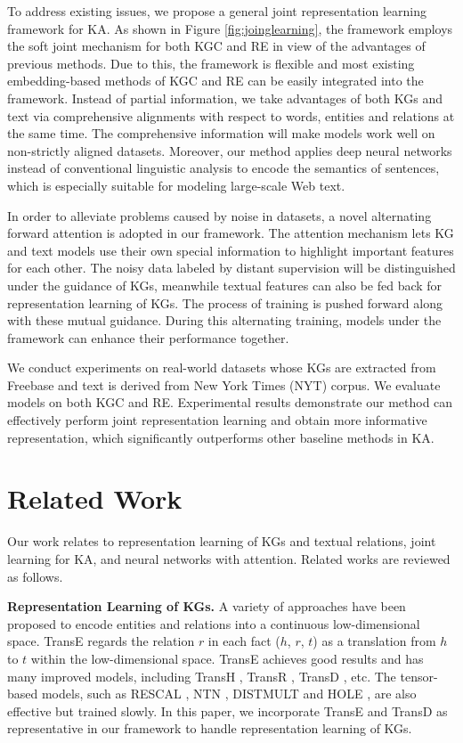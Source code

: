 \documentclass[letterpaper]{article} %
\begin{document}
To address existing issues, we propose a general joint representation learning framework for KA. As shown in Figure \ref{fig:joinglearning}, the framework employs the soft joint mechanism for both KGC and RE in view of the advantages of previous methods. Due to this, the framework is flexible and most existing embedding-based methods of KGC and RE can be easily integrated into the framework. Instead of partial information, we take advantages of both KGs and text via comprehensive alignments with respect to words, entities and relations at the same time. The comprehensive information will make models work well on non-strictly aligned datasets. Moreover, our method applies deep neural networks instead of conventional linguistic analysis to encode the semantics of sentences, which is especially suitable for modeling large-scale Web text. 

In order to alleviate problems caused by noise in datasets, a novel alternating forward attention is adopted in our framework. The attention mechanism lets KG and text models use their own special information to highlight important features for each other. The noisy data labeled by distant supervision will be distinguished under the guidance of KGs, meanwhile textual features can also be fed back for representation learning of KGs. The process of training is pushed forward along with these mutual guidance. During this alternating training, models under the framework can enhance their performance together.

We conduct experiments on real-world datasets whose KGs are extracted from Freebase and text is derived from New York Times (NYT) corpus. We evaluate models on both KGC and RE. Experimental results demonstrate our method can effectively perform joint representation learning and obtain more informative representation, which significantly outperforms other baseline methods in KA.



\section{Related Work}
\label{sec:related}
Our work relates to representation learning of KGs and textual relations, joint learning for KA, and neural networks with attention. Related works are reviewed as follows.

\textbf{Representation Learning of KGs.} A variety of approaches have been proposed to encode entities and relations into a continuous low-dimensional space. TransE \cite{bordes2013translating} regards the relation $r$ in each fact ($h$, $r$, $t$) as a translation from $h$ to $t$ within the low-dimensional space. TransE achieves good results and has many improved models, including TransH \cite{wang2014transh}, TransR \cite{lin2015learning}, TransD \cite{ji2015knowledge}, etc. The tensor-based models, such as RESCAL \cite{nickel2011three}, NTN \cite{socher2013reasoning}, DISTMULT \cite{yang2015embedding} and HOLE \cite{nickel2016holographic}, are also effective but trained slowly. In this paper, we incorporate TransE and TransD as representative in our framework to handle representation learning of KGs. 
\end{document}

